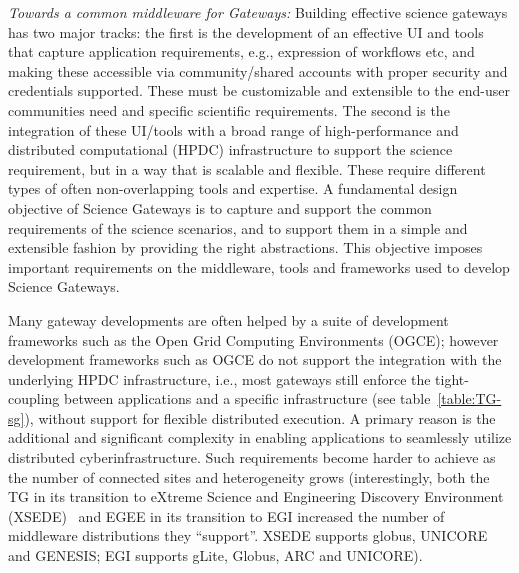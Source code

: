 \documentclass[]{svjour3}
\begin{document}
{\it Towards a common middleware for Gateways:} Building effective science gateways
has two major tracks: the first is the development of an effective UI
and tools that capture application requirements, e.g., expression of
workflows etc, and making these accessible via community/shared
accounts with proper security and credentials supported. These must be
customizable and extensible to the end-user communities need and
specific scientific requirements. The second is the integration of
these UI/tools with a broad range of high-performance and distributed
computational (HPDC) infrastructure to support
the science requirement, but in a way that is scalable and flexible.
These require different types of often non-overlapping tools and
expertise.  A fundamental design objective of Science Gateways is to
capture and support the common requirements of the science scenarios,
and to support them in a simple and extensible fashion by providing
the right abstractions.  This objective imposes
important %
requirements on the middleware, tools and frameworks used to develop
Science Gateways.

Many gateway developments are often helped by a suite of development
frameworks such as the Open Grid Computing
Environments\cite{ogce-2010} (OGCE); however development frameworks
such as OGCE do not support the integration with the underlying HPDC
infrastructure, i.e., most gateways still enforce the tight-coupling
between applications and a specific infrastructure (see
table~\ref{table:TG-sg}), without support for flexible distributed
execution.  A primary reason is the additional and significant
complexity in %
enabling applications to seamlessly utilize distributed
cyberinfrastructure. Such requirements become harder to achieve as the
number of connected sites and heterogeneity grows (interestingly, both
the TG in its transition to eXtreme Science and Engineering Discovery
Environment (XSEDE)~\cite{XSEDE} and EGEE in its transition to EGI
increased the number of middleware distributions they ``support''.
XSEDE supports globus, UNICORE and GENESIS; EGI supports gLite,
Globus, ARC and UNICORE).


\end{document}
